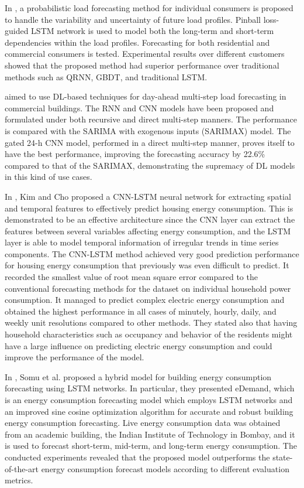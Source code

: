 In \cite{WANG201910}, a probabilistic load forecasting method for individual consumers is proposed to handle the variability and uncertainty of future load profiles.
Pinball loss-guided LSTM network is used to model both the long-term and short-term dependencies within the load profiles.
Forecasting for both residential and commercial consumers is tested.
Experimental results over different customers showed that the proposed method had superior performance over traditional methods such as QRNN, GBDT, and traditional LSTM.

\cite{CAI20191078} aimed to use DL-based techniques for day-ahead multi-step load forecasting in commercial buildings.
The RNN and CNN models have been proposed and formulated under both recursive and direct multi-step manners.
The performance is compared with the SARIMA with exogenous inputs (SARIMAX) model.
The gated 24-h CNN model, performed in a direct multi-step manner, proves itself to have the best performance, improving the forecasting accuracy by 22.6\% compared to that of the SARIMAX, demonstrating the supremacy of DL models in this kind of use cases.

In \cite{KIM201972}, Kim and Cho proposed a CNN-LSTM neural network for extracting spatial and temporal features to effectively predict housing energy consumption.
This is demonstrated to be an effective architecture since the CNN layer can extract the features between several variables affecting energy consumption, and the LSTM layer is able to model temporal information of irregular trends in time series components.
The CNN-LSTM method achieved very good prediction performance for housing energy consumption that previously was even difficult to predict.
It recorded the smallest value of root mean square error compared to the conventional forecasting methods for the dataset on individual household power consumption.
It managed to predict complex electric energy consumption and obtained the highest performance in all cases of minutely, hourly, daily, and weekly unit resolutions compared to other methods.
They stated also that having household characteristics such as occupancy and behavior of the residents might have a large influence on predicting electric energy consumption and could improve the performance of the model.

In \cite{SOMU2020114131}, Somu et al. proposed a hybrid model for building energy consumption forecasting using LSTM networks.
In particular, they presented eDemand, which is an energy consumption forecasting model which employs LSTM networks and an improved sine cosine optimization algorithm for accurate and robust building energy consumption forecasting.
Live energy consumption data was obtained from an academic building, the Indian Institute of Technology in Bombay, and it is used to forecast short-term, mid-term, and long-term energy consumption.
The conducted experiments revealed that the proposed model outperforms the state-of-the-art energy consumption forecast models according to different evaluation metrics.

